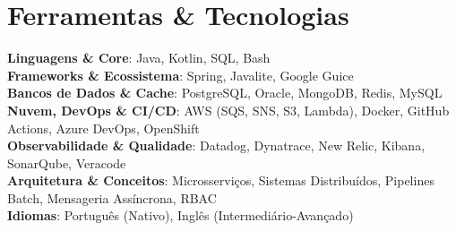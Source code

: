 \section{Ferramentas \& Tecnologias}
\begin{itemize}[leftmargin=0.15in, label={}]
  \small{\item{
    \textbf{Linguagens \& Core}{: Java, Kotlin, SQL, Bash} \\
    \textbf{Frameworks \& Ecossistema}{: Spring, Javalite, Google Guice} \\
    \textbf{Bancos de Dados \& Cache}{: PostgreSQL, Oracle, MongoDB, Redis, MySQL} \\
    \textbf{Nuvem, DevOps \& CI/CD}{: AWS (SQS, SNS, S3, Lambda), Docker, GitHub Actions, Azure DevOps, OpenShift} \\
    \textbf{Observabilidade \& Qualidade}{: Datadog, Dynatrace, New Relic, Kibana, SonarQube, Veracode} \\
    \textbf{Arquitetura \& Conceitos}{: Microsserviços, Sistemas Distribuídos, Pipelines Batch, Mensageria Assíncrona, RBAC} \\
    \textbf{Idiomas}{: Português (Nativo), Inglês (Intermediário-Avançado)} \\
  }}
\end{itemize}

